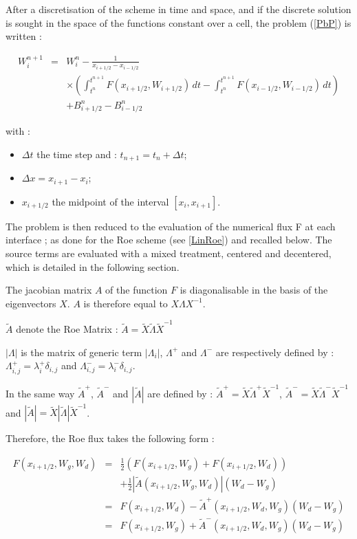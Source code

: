 After a discretisation of the scheme in time and space, and if the discrete solution is sought in the space of the functions constant over a cell, the problem (\ref{PbP}) is written :

\begin{eqnarray}
  W_{i}^{n+1} & = & W_{i}^{n} - \frac{1}{x_{i+1/2}-x_{i-1/2}} \nonumber \\
              &   & \times \left ( \int_{t^n}^{t^{n+1}} F(x_{i+1/2},W_{i+1/2})\, dt - \int_{t^n}^{t^{n+1}} F(x_{i-1/2},W_{i-1/2})\, dt  \right ) \nonumber \\
              &   & + B_{i+1/2}^n - B_{i-1/2}^n
\end{eqnarray}

with :
\begin{itemize}
  \item $\Delta t$ the time step and : $t_{n+1} = t_n + \Delta t$;
  \item $\Delta x = x_{i+1} - x_{i}$;
  \item $x_{i+1/2}$ the midpoint of the interval $[x_i , x_{i+1}]$.
\end{itemize}

The problem is then reduced to the evaluation of the numerical flux F at each interface ; as done for the Roe scheme (see \ref{LinRoe}) and recalled below. The source terms are evaluated with a mixed treatment, centered and decentered, which is detailed in the following section.

The jacobian matrix $A$ of the function $F$ is diagonalisable in the basis of the eigenvectors $X$. $A$ is therefore equal to $X \Lambda X^{-1}$.

$\tilde A$ denote the Roe Matrix : $\tilde A = \tilde X \tilde \Lambda \tilde{X}^{-1}$

$|\Lambda|$ is the matrix of generic term $|\Lambda_i|$, $\Lambda^+$ and $\Lambda^-$ are respectively defined by : $\Lambda_{i,j}^+ = \lambda_{i}^+ \delta_{i,j}$ and $\Lambda_{i,j}^- = \lambda_{i}^- \delta_{i,j}$.

In the same way $\tilde{A}^+$, $\tilde{A}^-$ and $|\tilde A|$ are defined by : $\tilde{A}^+ = \tilde X \tilde{\Lambda}^+ \tilde{X}^{-1}$, $\tilde{A}^- = \tilde X \tilde{\Lambda}^- \tilde{X}^{-1}$ and $|\tilde A| = \tilde X |\tilde \Lambda| \tilde{X}^{-1}$.

Therefore, the Roe flux takes the following form :

\begin{eqnarray}
 F(x_{i+1/2},W_g,W_d) & = & \frac{1}{2} \left ( F(x_{i+1/2},W_g) + F(x_{i+1/2},W_d) \right ) \nonumber \\
                      &   & + \frac{1}{2} \left | \tilde{A}(x_{i+1/2},W_g,W_d) \right | (W_d -W_g) \nonumber \\
 & = & F(x_{i+1/2},W_d) - \tilde{A}^+ (x_{i+1/2},W_d,W_g) (W_d - W_g) \nonumber \\
 & = & F(x_{i+1/2},W_g) + \tilde{A}^- (x_{i+1/2},W_d,W_g) (W_d - W_g) \nonumber \\
 & &
\end{eqnarray}

